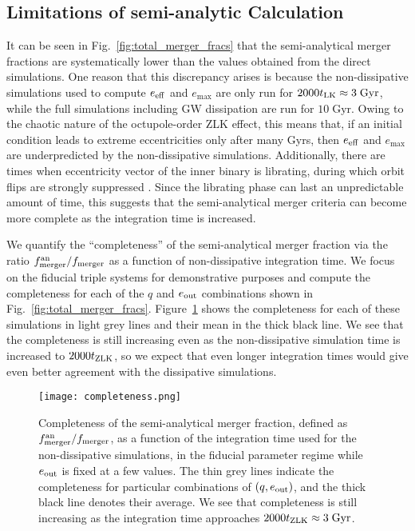 \documentclass[
        fleqn,
        usenatbib,
    ]{mnras}
\begin{document}
\subsection{Limitations of semi-analytic
Calculation}\label{ss:completeness}

It can be seen in Fig.~\ref{fig:total_merger_fracs} that the
semi-analytical merger fractions are systematically lower than
the values obtained from the direct simulations. One reason that this
discrepancy arises is because the non-dissipative simulations used to compute
$e_{\rm eff}$ and $e_{\max}$ are only run for $2000 t_{\rm LK} \approx
3\;\mathrm{Gyr}$, while the full simulations including GW dissipation are run
for $10\;\mathrm{Gyr}$. Owing to the chaotic nature of the octupole-order ZLK
effect, this means that, if an initial condition leads to extreme eccentricities
only after many Gyrs, then $e_{\rm eff}$ and $e_{\max}$ are underpredicted by
the non-dissipative simulations. Additionally, there are times when eccentricity
vector of the inner binary is librating, during which orbit flips are strongly
suppressed \citep{katz2011long}. Since the librating phase can last an
unpredictable amount of time, this suggests that the
semi-analytical merger criteria can become more complete as the
integration time is increased.

We quantify the ``completeness'' of the semi-analytical merger
fraction via the ratio $f_{\rm merger}^{\rm an} / f_{\rm merger}$ as a function
of non-dissipative integration time. We focus on the fiducial triple systems for
demonstrative purposes and compute the completeness for each of the $q$ and
$e_{\rm out}$ combinations shown in Fig.~\ref{fig:total_merger_fracs}.
Figure~\ref{fig:completeness} shows the completeness for each of these
simulations in light grey lines and their mean in the thick black line. We see
that the completeness is still increasing even as the non-dissipative simulation
time is increased to $2000t_{\rm ZLK}$, so we expect that even longer
integration times would give even better agreement with the dissipative
simulations.
\begin{figure}
    \centering
    \texttt{[image: completeness.png]}
    \caption{Completeness of the semi-analytical merger fraction, defined as $f_{\rm
    merger}^{\rm an} / f_{\rm merger}$, as a function of the integration time
    used for the non-dissipative simulations, in the fiducial parameter regime
    while $e_{\rm out}$ is fixed at a few values. The thin grey lines indicate
    the completeness for particular combinations of $(q, e_{\rm out})$, and the
    thick black line denotes their average. We see that completeness is still
    increasing as the integration time approaches $2000 t_{\rm ZLK} \approx
    3\;\mathrm{Gyr}$. }\label{fig:completeness}
\end{figure}
\end{document}
